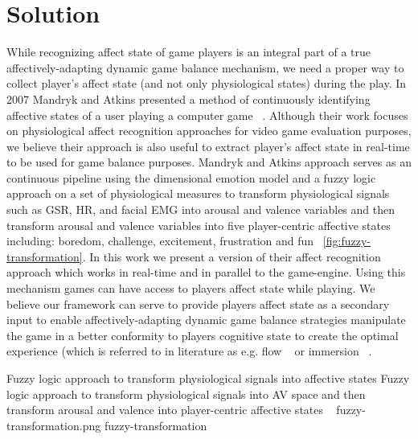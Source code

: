 \section{Solution}
While recognizing affect state of game players is an integral part of a true affectively-adapting dynamic game balance mechanism, we need a proper way to collect player's affect state (and not only physiological states) during the play. In 2007 Mandryk and Atkins presented a method of continuously identifying affective states of a user playing a computer game ~\cite{mandryk2007fuzzy}. Although their work focuses on physiological affect recognition approaches for video game evaluation purposes, we believe their approach is also useful to extract player's affect state in real-time to be used for game balance purposes. Mandryk and Atkins approach serves as an continuous pipeline using the dimensional emotion model and a fuzzy logic approach on a set of physiological measures to transform physiological signals such as GSR, HR, and facial EMG into arousal and valence variables and then transform arousal and valence variables into five player-centric affective states including: boredom, challenge, excitement, frustration and fun ~\ref{fig:fuzzy-transformation}. In this work we present a version of their affect recognition approach which works in real-time and in parallel to the game-engine. Using this mechanism games can have access to players affect state while playing. We believe our framework can serve to provide players affect state as a secondary input to enable affectively-adapting dynamic game balance strategies manipulate the game in a better conformity to players cognitive state to create the optimal experience (which is referred to in literature as e.g. flow ~\cite{chen2007flow} or immersion ~\cite{nacke2008flow}.

\largeimg
{Fuzzy logic approach to transform physiological signals into affective states}
{Fuzzy logic approach to transform physiological signals into AV space and then transform arousal and valence into player-centric affective states ~\cite{mandryk2007fuzzy}}
{fuzzy-transformation.png}
{fuzzy-transformation}

